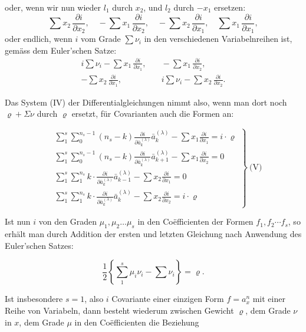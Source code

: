 oder, wenn wir nun wieder $l_1$ durch $x_2$, und $l_2$ durch $-x_1$ ersetzen:
\[
\sum x_2\,\frac{\partial i}{\partial x_2},\quad -\sum x_1\,\frac{\partial i}{\partial x_2},\quad -\sum x_2\,\frac{\partial i}{\partial x_1},\quad \sum x_1\,\frac{\partial i}{\partial x_1},
\]
oder endlich, wenn $i$ vom Grade $\sum \nu_i$ in den verschiedenen Variabelnreihen
 ist, gemäss dem Euler'schen Satze:
\[
\begin{aligned}
i\sum \nu_i - \sum x_1\,\frac{\partial i}{\partial x_1}, &\quad -\sum x_1\,\frac{\partial i}{\partial x_2},\\
-\sum x_2\,\frac{\partial i}{\partial x_1}, &\quad i\sum \nu_i - \sum x_2\,\frac{\partial i}{\partial x_2}.
\end{aligned}
\]


Das System (IV) der Differentialgleichungen nimmt also, wenn man dort noch $\varrho+\Sigma\nu$ durch $\varrho$ ersetzt, für Covarianten auch die Formen an:

\[
\left.
\begin{aligned}
&\sum_{1}^{s}\sum_{0}^{n_s-1}(n_s-k)\frac{\partial i}{\partial \bar a_k^{(\lambda)}}\bar a_k^{(\lambda)} - \sum x_1\frac{\partial i}{\partial x_1} = i\cdot\varrho\\
&\sum_{1}^{s}\sum_{0}^{n_s-1}(n_s-k)\frac{\partial i}{\partial \bar a_k^{(\lambda)}}\bar a_{k+1}^{(\lambda)} - \sum x_1\frac{\partial i}{\partial x_2} = 0\\
&\sum_{1}^{s}\sum_{1}^{n_s} k\cdot\frac{\partial i}{\partial \bar a_k^{(\lambda)}}\bar a_{k-1}^{(\lambda)} - \sum x_2\frac{\partial i}{\partial x_1} = 0\\
&\sum_{1}^{s}\sum_{1}^{n_s} k\cdot\frac{\partial i}{\partial \bar a_k^{(\lambda)}}\bar a_k^{(\lambda)} - \sum x_2\frac{\partial i}{\partial x_2} = i\cdot\varrho
\end{aligned}
\right\}\ \text{(V)}
\]

Ist nun $i$ von den Graden $\mu_1,\mu_2\ldots\mu_s$ in den Co\"efficienten der Formen $f_1,f_2\cdots f_s$, so erhält man durch Addition der ersten und letzten Gleichung nach Anwendung des Euler'schen Satzes:

\[
\frac{1}{2}\left\{\sum_1^s \mu_i\nu_i - \sum \nu_i\right\} = \varrho.
\]

Ist insbesondere $s=1$, also $i$ Covariante einer einzigen Form $f=a_x^n$ mit einer Reihe von Variabeln, dann besteht wiederum zwischen Gewicht $\varrho$, dem Grade $\nu$ in $x$, dem Grade $\mu$ in den Co\"efficienten die Beziehung

